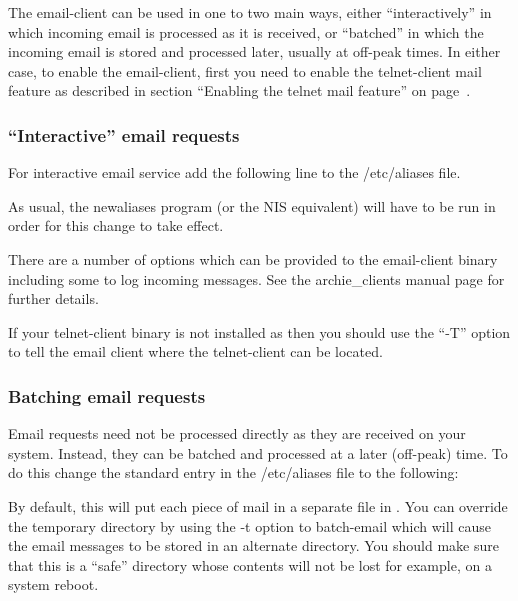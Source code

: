 The email-client can be used in one to two main ways, either ``interactively''
in which incoming email is processed as it is received, or ``batched'' in which
the incoming email is stored and processed later, usually at off-peak
times. In either case, to enable the email-client, first you need to enable
the telnet-client mail feature as described in section ``Enabling the telnet
mail feature'' on page~\pageref{sec:telnetmail}.

\subsubsection{``Interactive'' email requests}

For interactive email service add the following line to the /etc/aliases file.





As usual, the newaliases program (or the NIS equivalent) will have to be run
in order for this change to take effect.

There are a number of options which can be provided to the email-client binary
including some to log incoming messages. See the archie\_clients manual page
for further details.



If your telnet-client binary is not installed as 
then you should use the ``-T'' option to tell the email client where the
telnet-client can be located.



\subsubsection{Batching email requests}
\label{sec:batch}

Email requests need not be processed directly as they are received on your
system. Instead, they can be batched and processed at a later (off-peak)
time. To do this change the standard entry in the /etc/aliases file to the
following:






By default, this will put each piece of mail in a separate file in
. You can override the temporary directory by using the -t
option to batch-email which will cause the email messages to be stored in an
alternate directory. You should make sure that this is a ``safe'' directory
whose contents will not be lost for example, on a system reboot.

